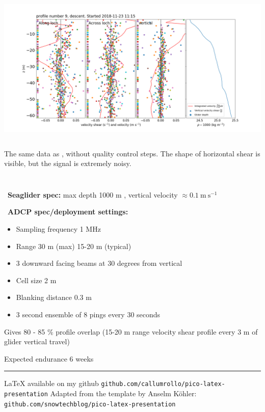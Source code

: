 \documentclass[unknownkeysallowed,usepdftitle=false]{beamer}
\newcommand{\secvariable}{nothing}
\newcommand{\mysection}[1]{\renewcommand{\secvariable}{#1}
}
\begin{document}
\begin{frame}\label{no_qc}
\vspace{-0.3cm}
\begin{center}
\includegraphics[trim=70 20 80 80,clip,width=\paperwidth]{figure/95_noqc.png}
\end{center}
\begin{columns}
\begin{column}[t]{0.9\textwidth}
The same data as \hyperlink{trial_shear}{}, without quality control steps. The shape of horizontal shear is visible, but the signal is extremely noisy.
\end{column}
\end{columns}
\end{frame}


\mysection{tech}
\begin{frame}\label{\secvariable}

\begin{columns}
\begin{column}[t]{0.9\textwidth}
\ \textbf{Seaglider spec:} max depth 1000 m , vertical velocity $\approx0.1\ \mathrm{m\ s^{-1}}$

\ \textbf{ADCP spec/deployment settings:}
\begin{itemize}
\item Sampling frequency 1 MHz 
\item Range 30 m (max) 15-20 m (typical)
\item 3 downward facing beams at 30 degrees from vertical 
\item Cell size 2 m
\item Blanking distance 0.3 m
\item 3 second ensemble of 8 pings every 30 seconds
\end{itemize}
Gives 80 - 85 \% profile overlap (15-20 m range velocity shear profile every 3 m of glider vertical travel)

Expected endurance 6 weeks \hyperlink{animation}{}
\noindent\rule[0.5ex]{\linewidth}{1pt}

\LaTeX{} available on my github  \texttt{github.com/callumrollo/pico-latex-presentation}
Adapted from the template by Anselm K\"ohler: \texttt{github.com/snowtechblog/pico-latex-presentation}
\end{column}
\end{columns}
\end{frame}
\end{document}
